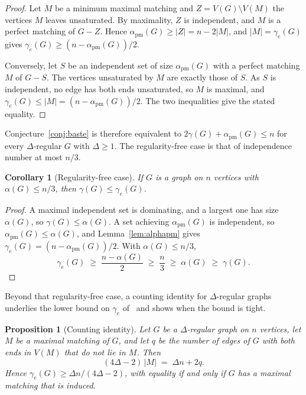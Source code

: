 \documentclass[11pt]{article}
\newtheorem{proposition}{Proposition}
\newtheorem{corollary}{Corollary}
\theoremstyle{definition}
\theoremstyle{remark}
\newcommand{\edom}{\gamma_{e}}
\newcommand{\alphapm}{\alpha_{\mathrm{pm}}}
\begin{document}
\begin{proof}
Let $M$ be a minimum maximal matching and $Z = V(G) \setminus V(M)$ the vertices $M$ leaves unsaturated.
By maximality, $Z$ is independent, and $M$ is a perfect matching of $G - Z$.
Hence $\alphapm(G) \ge |Z| = n - 2|M|$, and $|M| = \edom(G)$ gives $\edom(G) \ge (n - \alphapm(G))/2$.

\medskip\noindent
Conversely, let $S$ be an independent set of size $\alphapm(G)$ with a perfect
matching $M$ of $G - S$. The vertices unsaturated by $M$ are exactly those of
$S$. As $S$ is independent, no edge has both ends unsaturated, so $M$ is maximal,
and $\edom(G) \le |M| = (n - \alphapm(G))/2$. The two inequalities give the stated
equality.
\end{proof}

\noindent
Conjecture~\ref{conj:baste} is therefore equivalent to $2\gamma(G) +
\alphapm(G) \le n$ for every $\Delta$-regular $G$ with $\Delta \ge 1$. The
regularity-free case is that of independence number at most $n/3$.

\begin{corollary}[Regularity-free case]\label{cor:alpha}
If $G$ is a graph on $n$ vertices with $\alpha(G) \le n/3$, then $\gamma(G) \le
\edom(G)$.
\end{corollary}

\begin{proof}
A maximal independent set is dominating, and a largest one has size $\alpha(G)$,
so $\gamma(G) \le \alpha(G)$. A set achieving $\alphapm(G)$ is independent, so
$\alphapm(G) \le \alpha(G)$, and Lemma~\ref{lem:alphapm} gives $\edom(G) = (n -
\alphapm(G))/2$.
With $\alpha(G) \le n/3$,
\[
  \edom(G) \;\ge\; \frac{n - \alpha(G)}{2} \;\ge\; \frac{n}{3} \;\ge\; \alpha(G)
  \;\ge\; \gamma(G).
\]
\end{proof}

\noindent
Beyond that regularity-free case, a counting identity for $\Delta$-regular graphs
underlies the lower bound on $\edom$ of~\cite{BasteMMM2021} and shows when the
bound is tight.

\begin{proposition}[Counting identity]\label{prop:identity}
Let $G$ be a $\Delta$-regular graph on $n$ vertices, let $M$ be a maximal matching
of $G$, and let $q$ be the number of edges of $G$ with both ends in $V(M)$ that do
not lie in $M$. Then
\[
  (4\Delta - 2)\,|M| \;=\; \Delta n + 2q .
\]
Hence $\edom(G) \ge \Delta n/(4\Delta - 2)$, with equality if and only if $G$ has
a maximal matching that is induced.
\end{proposition}
\end{document}
